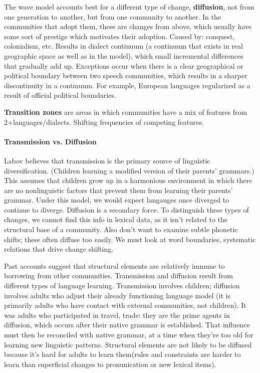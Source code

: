 \documentclass{exam}
\begin{document}
The wave model accounts best for a different type of change, \textbf{diffusion}, not from one generation to another, but from one community to another.  
In the communities that adopt them, these are changes from above, which usually have some sort of prestige which motivates their adoption. 
Caused by: conquest, colonialism, etc. 
Results in dialect continuum (a continuum that exists in real geographic space as well as in the model), which small incremental differences that gradually add up. 
Exceptions occur when there is a clear geographical or political boundary between two speech communities, which results in a sharper discontinuity in a continuum. 
For example, European languages regularized as a result of official political boundaries. 

\textbf{Transition zones} are areas in which communities have a mix of features from 2+languages/dialects.
Shifting frequencies of competing features. 

\paragraph{Transmission vs. Diffusion} Labov believes that transmission is the primary source of linguistic diversification. (Children learning a modified version of their parents' grammars.)
This assumes that children grow up in a harmonious environment in which there are no nonlinguistic factors that prevent them from learning their parents' grammar. 
Under this model, we would expect langauges once diverged to continue to diverge. 
Diffusion is a secondary force. 
To distinguish these types of changes, we cannot find this info in lexical data, as it isn't related to the structural base of a community. 
Also don't want to examine subtle phonetic shifts; these often diffuse too easily. 
We must look at word boundaries, systematic relations that drive change shifting.

Past accounts suggest that structural elements are relatively immune to borrowing from other communities.
Transmission and diffusion result from different types of language learning.
Transmission involves children; diffusion involves adults who adjust their already functioning language model (it is primarily adults who have contact with external communities, not children). 
It was adults who participated in travel, trade: they are the prime agents in diffusion, which occurs after their native grammar is established. 
That influence must then be reconciled with native grammar, at a time when they're too old for learning new linguistic patterns. 
Structural elements are not likely to be diffused because it's hard for adults to learn them(rules and constraints are harder to learn than superficial changes to pronunication or new lexical items). 
\end{document}
